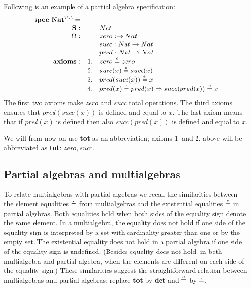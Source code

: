 \documentclass[10pt]{article}
\begin{document}
\begin{example}\label{ex:npa}
Following is an example of a partial algebra specification:
\[ \begin{array}{rrl}
{\bf spec\ Nat}^{{\mathcal{PA}}} = \\
	{{\bf S}}:	&& Nat\\
	{\Omega}:		&& zero:\to Nat\\
			&& succ:Nat \to Nat\\
			&& pred:Nat \to Nat\\
	{\bf axioms}:	&1.& zero \stackrel{e}{=} zero\\
			&2.& succ(x) \stackrel{e}{=} succ(x)\\
			&3.& pred(succ(x)) \stackrel{e}{=} x\\
			&4.& pred(x) \stackrel{e}{=} pred(x) \Rightarrow succ(pred(x)) \stackrel{e}{=} x \\
\end{array} \]
The first two axioms make $zero$ and $succ$ total operations. The third
axioms ensures that $pred(succ(x))$ is defined and equal to $x$. The last axiom
means that if $pred(x)$ is defined then also $succ(pred(x))$ is defined and equal
to $x$.
\end{example}
%
We will from now on use {\bf tot} as an abbreviation; axioms 1. and
2. above will be abbreviated as {\bf tot}: $zero,succ$.
  

\subsection{Partial algebras and multialgebras}\label{sub:rel}
To relate multialgebras with partial algebras we recall the similarities
between the element equalities $\mathrel{\dot{=} }$ from multialgebras and the existential
equalities $\stackrel{e}{=}$ in partial algebras. Both equalities hold when both sides
of the equality sign denote the same element. In a multialgebra, the equality
does not hold if one side of the equality sign is interpreted by a set with
cardinality greater than one or by the empty set. The existential equality does not hold in
a partial algebra if one side of the equality sign is undefined. 
(Besides equality does not hold, in both multialgebra and
partial algebra, when the elements are different on each side of the equality
sign.) These similarities suggest the straightforward relation between
multialgebras and partial algebras: replace {\bf tot} by {\bf det} and $\stackrel{e}{=}$
by $\mathrel{\dot{=} }$.
\end{document}
